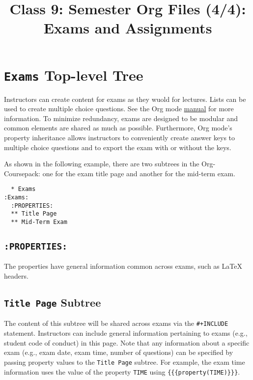 \documentclass[10pt,article]{article}
\date{\vspace{-6ex}}
\title{Class 9: Semester Org Files (4/4): Exams and Assignments}
\begin{document}
\maketitle
{} 
\thispagestyle{fancy}

\setcounter{tocdepth}{1}
\tableofcontents
\vspace{6ex}

\section{\texttt{Exams} Top-level Tree}
\label{sec:org2e7d9eb}
Instructors can create content for exams as they wuold for
lectures. Lists can be used to create multiple choice questions. See
the Org mode \href{https://orgmode.org/manual/Plain-lists.html}{manual} for more information. To minimize redundancy,
exams are designed to be modular and common elements are shared as
much as possible. Furthermore, Org mode's property inheritance allows
instructors to conveniently create answer keys to multiple choice
questions and to export the exam with or without the keys.

As shown in the following example, there are two subtrees in the
Org-Coursepack: one for the exam title page and another for the mid-term
exam.

\begin{verbatim}
  * Exams                                                          :Exams:
  :PROPERTIES:
  ** Title Page
  ** Mid-Term Exam
\end{verbatim}

\subsection{\texttt{:PROPERTIES:}}
\label{sec:org5b25ed3}
The properties have general information common across exams, such as \LaTeX{} headers.
\subsection{\texttt{Title Page} Subtree}
\label{sec:orgcdbd681}
The content of this subtree will be shared across exams via the
\texttt{\#+INCLUDE} statement. Instructors can include general information
pertaining to exams (e.g., student code of conduct) in this page. Note
that any information about a specific exam (e.g., exam date, exam
time, number of questions) can be specified by passing property values
to the \texttt{Title Page} subtree. For example, the exam time information
uses the value of the property \texttt{TIME} using \texttt{\{\{\{property(TIME)\}\}\}}.
\end{document}
